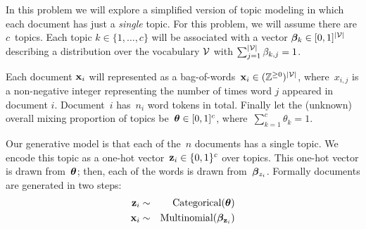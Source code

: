 \documentclass[submit]{harvardml}
\begin{document}
	
	In this problem we will explore a simplified version of topic
	modeling in which each document has just a \textit{single} topic.
	For this problem, we will assume there are $c$~topics. Each topic $k \in \{1, \ldots, c\}$ will be
	associated with a vector $\boldsymbol{\beta}_k \in [0,1]^{|\mathcal{V}|}$ describing a
	distribution over the vocabulary $\mathcal{V}$ with
	${\sum_{j=1}^{|\mathcal{V}|} \beta_{k,j}=1}$.
	
	Each document $\mathbf{x}_i$ will represented as a
	bag-of-words~$\mathbf{x}_{i} \in (\mathbb{Z}^{\geq 0})^{|\mathcal{V}|}$, where~$x_{i,j}$ is a
	non-negative integer representing the number of times word $j$ appeared in document $i$.  Document~$i$ has~$n_i$
	word tokens in total. Finally let the (unknown) overall mixing
	proportion of topics be~$\boldsymbol{\theta} \in [0,1]^c$,
	where~${\sum_{k=1}^c \theta_k=1}$.
	
	Our generative model is that each of the~$n$ documents has a single
	topic. We encode this topic as a one-hot
	vector~${\mathbf{z}_i \in \{0,1\}^c}$ over topics. This one-hot vector is
	drawn from~$\boldsymbol{\theta}$; then, each of the words is drawn
	from~$\boldsymbol{\beta}_{z_i}$. Formally documents are generated in two steps:
	\begin{eqnarray*}
		\mathbf{z}_i &\sim& \text{Categorical}(\boldsymbol{\theta}) \\
		\mathbf{x}_i &\sim& \text{Multinomial}(\boldsymbol{\beta}_{\mathbf{z}_i})   
	\end{eqnarray*}
	
\end{document}
